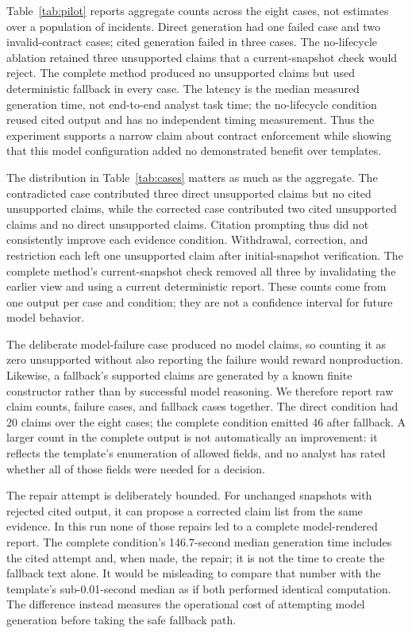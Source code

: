 Table~\ref{tab:pilot} reports aggregate counts across the eight cases, not estimates over a population of incidents. Direct generation had one failed case and two invalid-contract cases; cited generation failed in three cases. The no-lifecycle ablation retained three unsupported claims that a current-snapshot check would reject. The complete method produced no unsupported claims but used deterministic fallback in every case. The latency is the median measured generation time, not end-to-end analyst task time; the no-lifecycle condition reused cited output and has no independent timing measurement. Thus the experiment supports a narrow claim about contract enforcement while showing that this model configuration added no demonstrated benefit over templates.

The distribution in Table~\ref{tab:cases} matters as much as the aggregate. The contradicted case contributed three direct unsupported claims but no cited unsupported claims, while the corrected case contributed two cited unsupported claims and no direct unsupported claims. Citation prompting thus did not consistently improve each evidence condition. Withdrawal, correction, and restriction each left one unsupported claim after initial-snapshot verification. The complete method's current-snapshot check removed all three by invalidating the earlier view and using a current deterministic report. These counts come from one output per case and condition; they are not a confidence interval for future model behavior.

The deliberate model-failure case produced no model claims, so counting it as zero unsupported without also reporting the failure would reward nonproduction. Likewise, a fallback's supported claims are generated by a known finite constructor rather than by successful model reasoning. We therefore report raw claim counts, failure cases, and fallback cases together. The direct condition had 20 claims over the eight cases; the complete condition emitted 46 after fallback. A larger count in the complete output is not automatically an improvement: it reflects the template's enumeration of allowed fields, and no analyst has rated whether all of those fields were needed for a decision.

The repair attempt is deliberately bounded. For unchanged snapshots with rejected cited output, it can propose a corrected claim list from the same evidence. In this run none of those repairs led to a complete model-rendered report. The complete condition's 146.7-second median generation time includes the cited attempt and, when made, the repair; it is not the time to create the fallback text alone. It would be misleading to compare that number with the template's sub-0.01-second median as if both performed identical computation. The difference instead measures the operational cost of attempting model generation before taking the safe fallback path.

